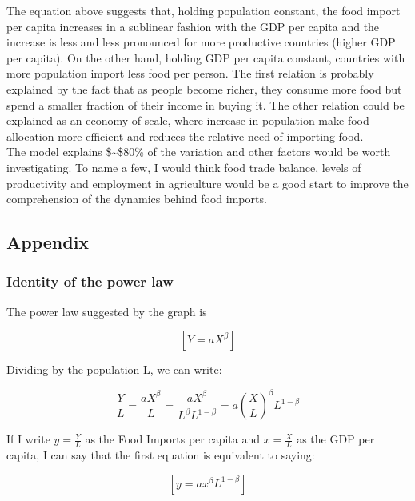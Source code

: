 \documentclass{article}
\begin{document}
    The equation above suggests that, holding population constant, the food
import per capita increases in a sublinear fashion with the GDP per
capita and the increase is less and less pronounced for more productive
countries (higher GDP per capita). On the other hand, holding GDP per
capita constant, countries with more population import less food per
person. The first relation is probably explained by the fact that as
people become richer, they consume more food but spend a smaller
fraction of their income in buying it. The other relation could be
explained as an economy of scale, where increase in population make food
allocation more efficient and reduces the relative need of importing
food.\\
The model explains \$\sim\$80\% of the variation and other factors would
be worth investigating. To name a few, I would think food trade balance,
levels of productivity and employment in agriculture would be a good
start to improve the comprehension of the dynamics behind food imports.

    \subsection{Appendix}\label{appendix}

    \subsubsection{Identity of the power
law}\label{identity-of-the-power-law}

    The power law suggested by the graph is

\begin{equation}
\left[
Y = aX^{\beta}    
\right]
\end{equation}

Dividing by the population L, we can write:

\[\frac{Y}{L} = \frac{aX^{\beta}}{L} = \frac{aX^{\beta}}{L^{\beta}L^{1-\beta}} = a(\frac{X}{L})^{\beta}L^{1-{\beta}}\]

If I write \(y = \frac{Y}{L}\) as the Food Imports per capita and
\(x = \frac{X}{L}\) as the GDP per capita, I can say that the first
equation is equivalent to saying:

\begin{equation}
\left[
y = ax^{\beta}L^{1-\beta}
\right]
\end{equation}


    
    
    
    
\end{document}
